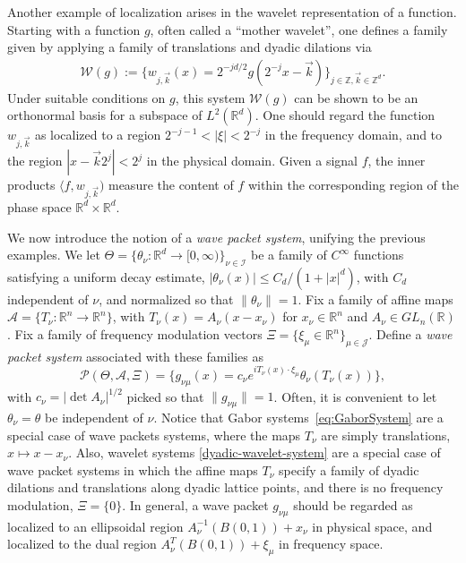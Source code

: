 \documentclass[conference]{IEEEtran}
\def\R{\mathbb{R}}
\numberwithin{equation}{section}
\newcommand{\Z}{\mathbb Z}
\def\R{\mathbb{R}}
\begin{document}
Another example of localization arises in the wavelet representation of a function. Starting with a function $g$, often called a ``mother wavelet'', one defines a family given by applying a family of translations and dyadic dilations via
\begin{align}\label{dyadic-wavelet-system}
\mathcal{W}(g) := 
\big\{ w_{j,\vec{k}}(x) = 2^{-jd/2} g(2^{-j}x - \vec{k}) \big\}_{j \in \Z, \vec{k} \in \Z^d}.
\end{align}
Under suitable conditions on $g$, this system $\mathcal{W}(g)$ can be shown to be an orthonormal basis for a subspace of $L^2(\R^d)$. One should regard the function $w_{j,\vec{k}}$ as localized to a region $2^{-j-1} <|\xi| < 2^{-j}$ in the frequency domain, and to the region $|x-\vec{k} 2^{j}| < 2^j$ in the physical domain. Given a signal $f$, the inner products $\langle f, w_{j,\vec{k}})$ measure the content of $f$ within the corresponding region of the phase space $\R^d \times \R^d$.


We now introduce the notion of a \emph{wave packet system}, unifying the previous examples. We let $\Theta = \{\theta_\nu : \R^d \rightarrow [0,\infty) \}_{\nu \in \mathcal{I}}$ be a family of $C^\infty$ functions satisfying a uniform decay estimate, $|\theta_\nu(x)| \leq C_d/(1+|x|^d)$, with $C_d$ independent of $\nu$, and normalized so that $\| \theta_\nu \| = 1$. Fix a family of affine maps $\mathcal{A} = \{T_\nu : \R^n \rightarrow \R^n\}$, with $T_\nu(x) = A_\nu(x-x_\nu)$ for $x_\nu \in \R^n$ and $A_\nu \in GL_n(\R)$. Fix a family of frequency modulation vectors $\Xi=\{\xi_\mu \in \R^n\}_{\mu \in \mathcal{J}}$. Define a \emph{wave packet system} associated with these families as
\begin{equation}
\mathcal{P}(\Theta,\mathcal{A},\Xi) = \{ g_{\nu\mu}(x) = c_\nu e^{ i T_\nu(x) \cdot \xi_\mu}\theta_\nu(T_\nu(x))  \},
\end{equation}
with $c_\nu = |\det A_\nu|^{1/2}$ picked so that $\| g_{\nu\mu}\| = 1$. Often, it is convenient to let $\theta_\nu = \theta$ be independent of $\nu$. 
Notice that Gabor systems~\eqref{eq:GaborSystem}  are a special case of wave packets systems, where the maps $T_\nu$ are simply translations, $x \mapsto x - x_\nu$. 
Also, wavelet systems \eqref{dyadic-wavelet-system} are a special case of wave packet systems in which the affine maps $T_\nu$ specify a family of dyadic dilations and translations along dyadic lattice points, and there is no frequency modulation, $\Xi = \{0\}$. In general, a wave packet $g_{\nu \mu}$ should be regarded as localized to an ellipsoidal region $A_\nu^{-1}(B(0,1)) + x_\nu$ in physical space, and localized to the dual region $A_\nu^{T} (B(0,1)) + \xi_\mu$ in frequency space. 
\end{document}
